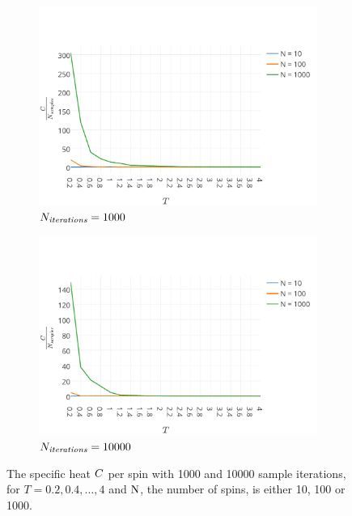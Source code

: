 	\begin{figure}
		\centering
		\begin{subfigure}{0.49\textwidth}
			\centering
			\includegraphics[width=\textwidth, keepaspectratio=true]{img/1D/1DspecificHeatN1000.pdf}
			\caption{$N_\textit{iterations} = 1000$}
			\label{fig:results:1D:C:1000}
		\end{subfigure}
		\begin{subfigure}{0.49\textwidth}
			\centering
			\includegraphics[width=\textwidth, keepaspectratio=true]{img/1D/1DspecificHeatN10000.pdf}
			\caption{$N_\textit{iterations} = 10000$}
			\label{fig:results:1D:C:10000}
		\end{subfigure}	
		\caption{The specific heat $C$ per spin with  1000 and  10000 sample iterations, for $T = 0.2, 0.4, \dotsc, 4$ and $\mathrm{N}$, the number of spins, is either 10, 100 or 1000.}
		\label{fig:results:1D:C}
	\end{figure}


